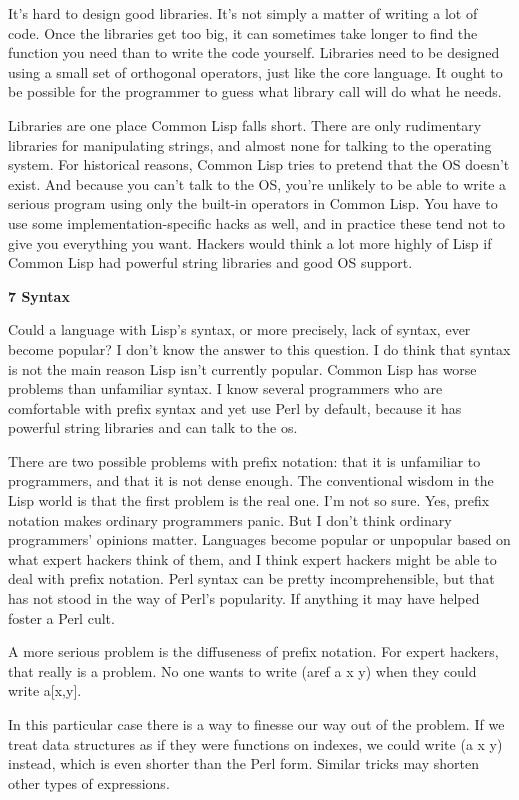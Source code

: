 \documentclass[12pt]{book}
\begin{document}
It's hard to design good libraries. It's not simply a matter of writing
a lot of code. Once the libraries get too big, it can sometimes take
longer to find the function you need than to write the code yourself.
Libraries need to be designed using a small set of orthogonal operators,
just like the core language. It ought to be possible for the programmer
to guess what library call will do what he needs.

Libraries are one place Common Lisp falls short. There are only
rudimentary libraries for manipulating strings, and almost none for
talking to the operating system. For historical reasons, Common Lisp
tries to pretend that the OS doesn't exist. And because you can't talk
to the OS, you're unlikely to be able to write a serious program using
only the built-in operators in Common Lisp. You have to use some
implementation-specific hacks as well, and in practice these tend not to
give you everything you want. Hackers would think a lot more highly of
Lisp if Common Lisp had powerful string libraries and good OS support.

\textbf{7 Syntax}

Could a language with Lisp's syntax, or more precisely, lack of syntax,
ever become popular? I don't know the answer to this question. I do
think that syntax is not the main reason Lisp isn't currently popular.
Common Lisp has worse problems than unfamiliar syntax. I know several
programmers who are comfortable with prefix syntax and yet use Perl by
default, because it has powerful string libraries and can talk to the
os.

There are two possible problems with prefix notation: that it is
unfamiliar to programmers, and that it is not dense enough. The
conventional wisdom in the Lisp world is that the first problem is the
real one. I'm not so sure. Yes, prefix notation makes ordinary
programmers panic. But I don't think ordinary programmers' opinions
matter. Languages become popular or unpopular based on what expert
hackers think of them, and I think expert hackers might be able to deal
with prefix notation. Perl syntax can be pretty incomprehensible, but
that has not stood in the way of Perl's popularity. If anything it may
have helped foster a Perl cult.

A more serious problem is the diffuseness of prefix notation. For expert
hackers, that really is a problem. No one wants to write (aref a x y)
when they could write a{[}x,y{]}.

In this particular case there is a way to finesse our way out of the
problem. If we treat data structures as if they were functions on
indexes, we could write (a x y) instead, which is even shorter than the
Perl form. Similar tricks may shorten other types of expressions.
\end{document}
